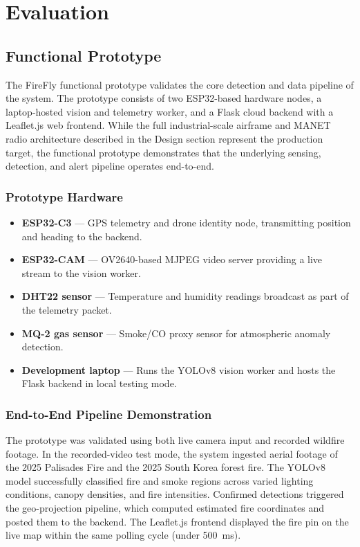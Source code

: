 \documentclass[journal, onecolumn]{IEEEtran}
\begin{document}
\section{Evaluation}

\subsection{Functional Prototype}

The FireFly functional prototype validates the core detection and data pipeline of the system. The prototype consists of two ESP32-based hardware nodes, a laptop-hosted vision and telemetry worker, and a Flask cloud backend with a Leaflet.js web frontend. While the full industrial-scale airframe and MANET radio architecture described in the Design section represent the production target, the functional prototype demonstrates that the underlying sensing, detection, and alert pipeline operates end-to-end.

\subsubsection{Prototype Hardware}
\begin{itemize}
    \item \textbf{ESP32-C3} — GPS telemetry and drone identity node, transmitting position and heading to the backend.
    \item \textbf{ESP32-CAM} — OV2640-based MJPEG video server providing a live stream to the vision worker.
    \item \textbf{DHT22 sensor} — Temperature and humidity readings broadcast as part of the telemetry packet.
    \item \textbf{MQ-2 gas sensor} — Smoke/CO proxy sensor for atmospheric anomaly detection.
    \item \textbf{Development laptop} — Runs the YOLOv8 vision worker and hosts the Flask backend in local testing mode.
\end{itemize}

\subsubsection{End-to-End Pipeline Demonstration}
The prototype was validated using both live camera input and recorded wildfire footage. In the recorded-video test mode, the system ingested aerial footage of the 2025 Palisades Fire and the 2025 South Korea forest fire. The YOLOv8 model successfully classified fire and smoke regions across varied lighting conditions, canopy densities, and fire intensities. Confirmed detections triggered the geo-projection pipeline, which computed estimated fire coordinates and posted them to the backend. The Leaflet.js frontend displayed the fire pin on the live map within the same polling cycle (under 500~ms).
\end{document}
